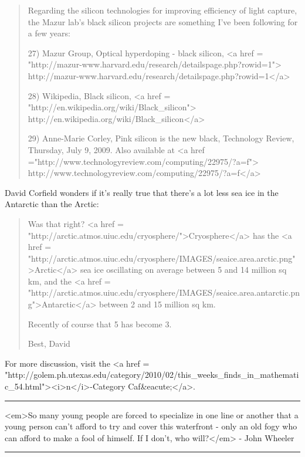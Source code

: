 \begin{quote}
Regarding the silicon technologies for improving efficiency of light capture, 
the Mazur lab's black silicon projects are something I've been following for a 
few years:

27) Mazur Group, Optical hyperdoping - black silicon, 
<a href = "http://mazur-www.harvard.edu/research/detailspage.php?rowid=1">
http://mazur-www.harvard.edu/research/detailspage.php?rowid=1</a>

28) Wikipedia, Black silicon, <a href =
"http://en.wikipedia.org/wiki/Black_silicon">
http://en.wikipedia.org/wiki/Black_silicon</a>

29) Anne-Marie Corley, Pink silicon is the new black, Technology
Review, Thursday, July 9, 2009.  Also available at <a href
="http://www.technologyreview.com/computing/22975/?a=f">
http://www.technologyreview.com/computing/22975/?a=f</a>

\end{quote}


David Corfield wonders if it's really true that there's a
lot less sea ice in the Antarctic than the Arctic:

\begin{quote}

Was that right? <a href = "http://arctic.atmos.uiuc.edu/cryosphere/">Cryosphere</a> has the 
<a href = 
"http://arctic.atmos.uiuc.edu/cryosphere/IMAGES/seaice.area.arctic.png">Arctic</a> sea ice oscillating on average between 5 and 14 million sq km, and the
<a href = "http://arctic.atmos.uiuc.edu/cryosphere/IMAGES/seaice.area.antarctic.png">Antarctic</a> between 2 and 15 million sq km.


Recently of course that 5 has become 3.

Best, David

\end{quote}




For more discussion, visit the
<a href = "http://golem.ph.utexas.edu/category/2010/02/this_weeks_finds_in_mathematic_54.html"><i>n</i>-Category Caf&eacute;</a>.

\par\noindent\rule{\textwidth}{0.4pt}
<em>So many young people are forced to specialize in one line or another that 
a young person can't afford to try and cover this waterfront - only an old 
fogy who can afford to make a fool of himself.  If I don't, who will?</em> -
John Wheeler

\par\noindent\rule{\textwidth}{0.4pt}

